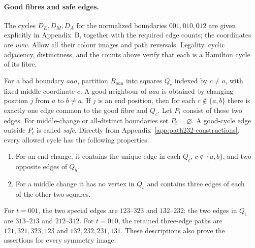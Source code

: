 \documentclass[11pt]{article}
\theoremstyle{remark}
\numberwithin{equation}{section}
\numberwithin{table}{section}
\begin{document}
\paragraph{Good fibres and safe edges.}
The cycles $D_E,D_M,D_A$ for the normalized boundaries $001,010,012$
are given explicitly in Appendix~B, together with the required edge counts;
the coordinates are $uvw$.
Allow all their colour images and path reversals. Legality, cyclic adjacency, distinctness, and the counts
above verify that each is a Hamilton cycle of its fibre.

For a bad boundary $aaa$, partition $B_{aaa}$ into squares $Q_c$ indexed
by $c\ne a$, with fixed middle coordinate $c$. A good neighbour of
$aaa$ is obtained by changing position $j$ from $a$ to $b\ne a$.
If $j$ is an end position, then for each $c\notin\{a,b\}$ there is
exactly one edge common to the good fibre and $Q_c$. Let $P_t$ consist
of these two edges. For middle-change or all-distinct boundaries set
$P_t=\varnothing$. A good-cycle edge outside $P_t$ is called \emph{safe}.
Directly from Appendix~\ref{app:path232-constructions}, every allowed cycle has the following properties:
\begin{enumerate}
\item For an end change, it contains the unique edge in each
      $Q_c$, $c\notin\{a,b\}$, and two opposite edges of $Q_b$.
\item For a middle change it has no vertex in $Q_b$ and contains
      three edges of each of the other two squares.
\end{enumerate}
For $t=001$, the two special edges are $123$--$323$ and $132$--$232$;
the two edges in $Q_1$ are $313$--$213$ and $212$--$312$.
For $t=010$, the retained three-edge paths are
$121,321,323,123$ and $132,232,231,131$.
These descriptions also prove the assertions for every symmetry image.
\end{document}
